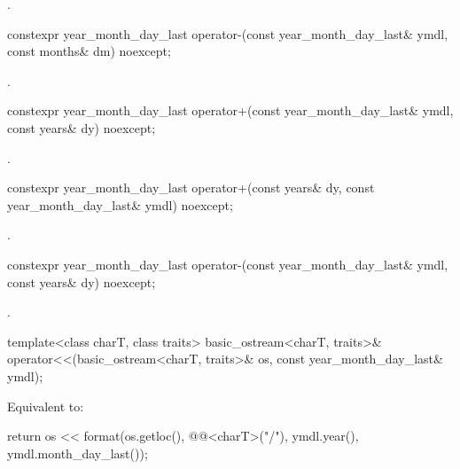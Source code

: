 \begin{itemdescr}
\pnum
\returns
{}.
\end{itemdescr}

%
\begin{itemdecl}
constexpr year_month_day_last
  operator-(const year_month_day_last& ymdl, const months& dm) noexcept;
\end{itemdecl}

\begin{itemdescr}
\pnum
\returns
{}.
\end{itemdescr}

%
\begin{itemdecl}
constexpr year_month_day_last
  operator+(const year_month_day_last& ymdl, const years& dy) noexcept;
\end{itemdecl}

\begin{itemdescr}
\pnum
\returns
{}.
\end{itemdescr}

%
\begin{itemdecl}
constexpr year_month_day_last
  operator+(const years& dy, const year_month_day_last& ymdl) noexcept;
\end{itemdecl}

\begin{itemdescr}
\pnum
\returns
{}.
\end{itemdescr}

%
\begin{itemdecl}
constexpr year_month_day_last
  operator-(const year_month_day_last& ymdl, const years& dy) noexcept;
\end{itemdecl}

\begin{itemdescr}
\pnum
\returns
{}.
\end{itemdescr}

%
\begin{itemdecl}
template<class charT, class traits>
  basic_ostream<charT, traits>&
    operator<<(basic_ostream<charT, traits>& os, const year_month_day_last& ymdl);
\end{itemdecl}

\begin{itemdescr}
\pnum
\effects
Equivalent to:
\begin{codeblock}
return os << format(os.getloc(), @@<charT>("{}/{}"),
                    ymdl.year(), ymdl.month_day_last());
\end{codeblock}
\end{itemdescr}

